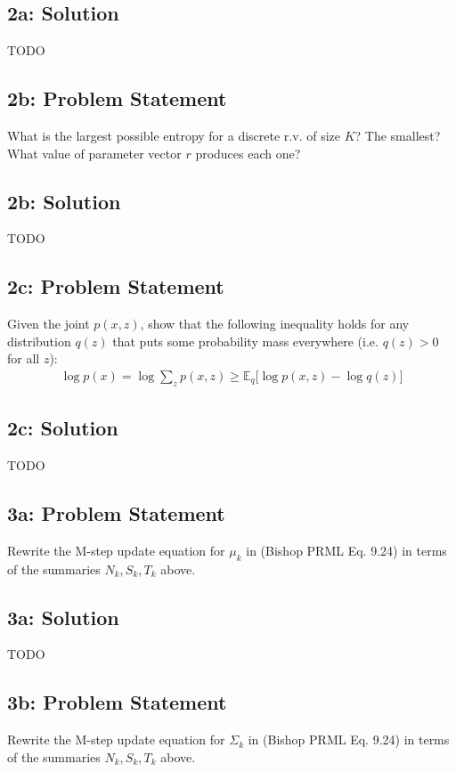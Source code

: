 \documentclass[10pt]{article}
\newcommand{\officialdirections}[1]{{\color{blue} #1}}
\begin{document}
\subsection{2a: Solution}

TODO


\officialdirections{
\subsection*{2b: Problem Statement}
What is the largest possible entropy for a discrete r.v. of size $K$? The smallest? What value of parameter vector $r$ produces each one?
}

\subsection{2b: Solution}

TODO


\newpage
\officialdirections{
\subsection*{2c: Problem Statement}
Given the joint $p(x,z)$, show that the following inequality holds for any distribution $q(z)$ that puts some probability mass everywhere (i.e. $q(z) > 0$ for all $z$):
\begin{align}
\log p(x) = \log \sum_z p(x,z) \geq \mathbb{E}_{q} \big[ \log p(x, z) - \log q(z) \big]
\end{align}
}

\subsection{2c: Solution}

TODO


\newpage
\officialdirections{
\subsection*{3a: Problem Statement}
Rewrite the M-step update equation for $\mu_k$ in (Bishop PRML Eq. 9.24) in terms of the summaries $N_k, S_k, T_k$ above.
}

\subsection{3a: Solution}

TODO



\officialdirections{
\subsection*{3b: Problem Statement}
Rewrite the M-step update equation for $\Sigma_k$ in (Bishop PRML Eq. 9.24) in terms of the summaries $N_k, S_k, T_k$ above.
}
\end{document}
